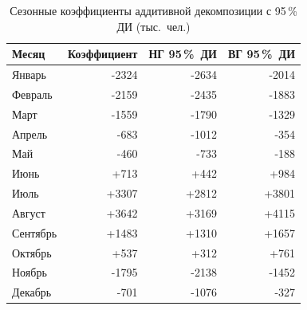 \begin{table}[h!]
\centering
\caption{Сезонные коэффициенты аддитивной декомпозиции с 95\,\% ДИ (тыс.~чел.)}
\label{tab:seasonal}
{\small
\begin{tabular}{lrrr}
\toprule
Месяц & Коэффициент & НГ 95\,\%~ДИ & ВГ 95\,\%~ДИ \\
\midrule
Январь & -2324 & -2634 & -2014 \\
Февраль & -2159 & -2435 & -1883 \\
Март & -1559 & -1790 & -1329 \\
Апрель & -683 & -1012 & -354 \\
Май & -460 & -733 & -188 \\
Июнь & +713 & +442 & +984 \\
Июль & +3307 & +2812 & +3801 \\
Август & +3642 & +3169 & +4115 \\
Сентябрь & +1483 & +1310 & +1657 \\
Октябрь & +537 & +312 & +761 \\
Ноябрь & -1795 & -2138 & -1452 \\
Декабрь & -701 & -1076 & -327 \\
\bottomrule
\end{tabular}}
\end{table}
